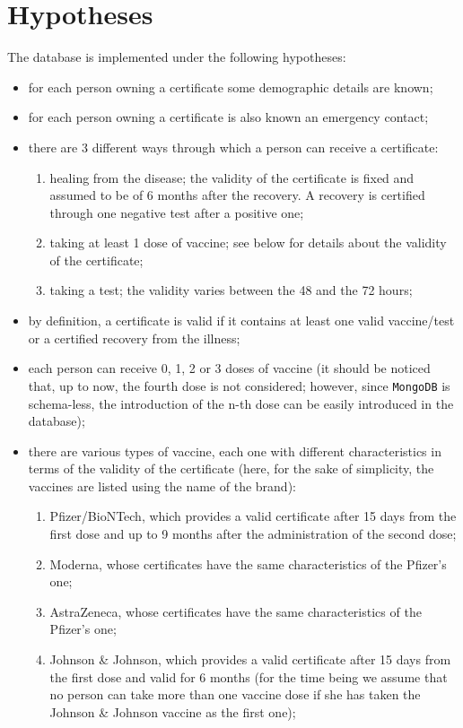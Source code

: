\documentclass{article}
\begin{document}
\section{Hypotheses} \label{hypotheses}
The database is implemented under the following hypotheses:
\begin{itemize}
    \item for each person owning a certificate some demographic details are known;
    \item for each person owning a certificate is also known an emergency contact;
    \item there are 3 different ways through which a person can receive a certificate:
    \begin{enumerate}
        \item healing from the disease; the validity of the certificate is fixed and assumed to be of 6 months after the recovery. A recovery is certified through one negative test after a positive one;
        \item taking at least 1 dose of vaccine; see below for details about the validity of the certificate;
        \item taking a test; the validity varies between the 48 and the 72 hours;
    \end{enumerate}
    \item by definition, a certificate is valid if it contains at least one valid vaccine/test or a certified recovery from the illness;
    \item each person can receive 0, 1, 2 or 3 doses of vaccine (it should be noticed that, up to now, the fourth dose is not considered; however, since \verb|MongoDB| is schema-less, the introduction of the n-th dose can be easily introduced in the database);
\item there are various types of vaccine, each one with different characteristics in terms of the validity of the certificate (here, for the sake of simplicity, the vaccines are listed using the name of the brand):
\begin{enumerate}
    \item Pfizer/BioNTech, which provides a valid certificate after 15 days from the first dose and up to 9 months after the administration of the second dose;
    \item Moderna, whose certificates have the same characteristics of the Pfizer's one;
    \item AstraZeneca, whose certificates have the same characteristics of the Pfizer's one;
    \item Johnson \& Johnson, which provides a valid certificate after 15 days from the first dose and valid for 6 months (for the time being we assume that no person can take more than one vaccine dose if she has taken the Johnson \& Johnson vaccine as the first one);

\end{enumerate}
\end{itemize}
\end{document}
